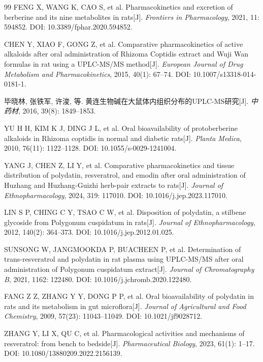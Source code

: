 \documentclass[12pt,a4paper,UTF8,openany]{ctexbook}
\begin{document}
\begin{thebibliography}{99}
FENG X, WANG K, CAO S, et al. Pharmacokinetics and excretion of berberine and its nine metabolites in rats[J]. \textit{Frontiers in Pharmacology}, 2021, 11: 594852. DOI: 10.3389/fphar.2020.594852.

CHEN Y, XIAO F, GONG Z, et al. Comparative pharmacokinetics of active alkaloids after oral administration of Rhizoma Coptidis extract and Wuji Wan formulas in rat using a UPLC-MS/MS method[J]. \textit{European Journal of Drug Metabolism and Pharmacokinetics}, 2015, 40(1): 67--74. DOI: 10.1007/s13318-014-0181-1.

毕晓林, 张铁军, 许浚, 等. 黄连生物碱在大鼠体内组织分布的UPLC-MS研究[J]. \textit{中药材}, 2016, 39(8): 1849--1853.

YU H H, KIM K J, DING J L, et al. Oral bioavailability of protoberberine alkaloids in Rhizoma coptidis in normal and diabetic rats[J]. \textit{Planta Medica}, 2010, 76(11): 1122--1128. DOI: 10.1055/s-0029-1241004.

YANG J, CHEN Z, LI Y, et al. Comparative pharmacokinetics and tissue distribution of polydatin, resveratrol, and emodin after oral administration of Huzhang and Huzhang-Guizhi herb-pair extracts to rats[J]. \textit{Journal of Ethnopharmacology}, 2024, 319: 117010. DOI: 10.1016/j.jep.2023.117010.

LIN S P, CHING C Y, TSAO C W, et al. Disposition of polydatin, a stilbene glycoside from Polygonum cuspidatum in rats[J]. \textit{Journal of Ethnopharmacology}, 2012, 140(2): 364--373. DOI: 10.1016/j.jep.2012.01.025.

SUNSONG W, JANGMOOKDA P, BUACHEEN P, et al. Determination of trans-resveratrol and polydatin in rat plasma using UPLC-MS/MS after oral administration of Polygonum cuspidatum extract[J]. \textit{Journal of Chromatography B}, 2021, 1162: 122480. DOI: 10.1016/j.jchromb.2020.122480.

FANG Z Z, ZHANG Y Y, DONG P P, et al. Oral bioavailability of polydatin in rats and its metabolism in gut microflora[J]. \textit{Journal of Agricultural and Food Chemistry}, 2009, 57(23): 11043--11049. DOI: 10.1021/jf9028712.

ZHANG Y, LI X, QU C, et al. Pharmacological activities and mechanisms of resveratrol: from bench to bedside[J]. \textit{Pharmaceutical Biology}, 2023, 61(1): 1--17. DOI: 10.1080/13880209.2022.2156139.


\end{thebibliography}
\end{document}
